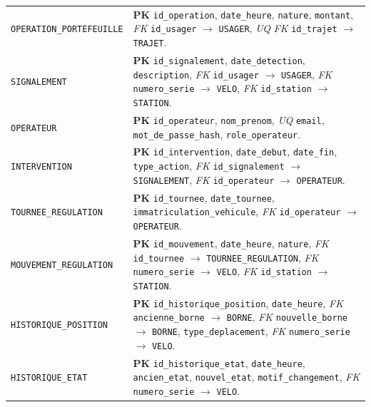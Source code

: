\documentclass[11pt,a4paper]{article}
\newcommand{\pk}{\textbf{PK}}
\newcommand{\fk}{\textit{FK}}
\newcommand{\uq}{\textit{UQ}}
\begin{document}
\begin{longtable}{>{\raggedright\arraybackslash}p{}>{\raggedright\arraybackslash}p{}}
\texttt{OPERATION\_PORTEFEUILLE} & \pk{} \texttt{id\_operation}, \texttt{date\_heure}, \texttt{nature}, \texttt{montant}, \fk{} \texttt{id\_usager} $\rightarrow$ \texttt{USAGER}, \uq{} \fk{} \texttt{id\_trajet} $\rightarrow$ \texttt{TRAJET}.\\
\texttt{SIGNALEMENT} & \pk{} \texttt{id\_signalement}, \texttt{date\_detection}, \texttt{description}, \fk{} \texttt{id\_usager} $\rightarrow$ \texttt{USAGER}, \fk{} \texttt{numero\_serie} $\rightarrow$ \texttt{VELO}, \fk{} \texttt{id\_station} $\rightarrow$ \texttt{STATION}.\\
\texttt{OPERATEUR} & \pk{} \texttt{id\_operateur}, \texttt{nom\_prenom}, \uq{} \texttt{email}, \texttt{mot\_de\_passe\_hash}, \texttt{role\_operateur}.\\
\texttt{INTERVENTION} & \pk{} \texttt{id\_intervention}, \texttt{date\_debut}, \texttt{date\_fin}, \texttt{type\_action}, \fk{} \texttt{id\_signalement} $\rightarrow$ \texttt{SIGNALEMENT}, \fk{} \texttt{id\_operateur} $\rightarrow$ \texttt{OPERATEUR}.\\
\texttt{TOURNEE\_REGULATION} & \pk{} \texttt{id\_tournee}, \texttt{date\_tournee}, \texttt{immatriculation\_vehicule}, \fk{} \texttt{id\_operateur} $\rightarrow$ \texttt{OPERATEUR}.\\
\texttt{MOUVEMENT\_REGULATION} & \pk{} \texttt{id\_mouvement}, \texttt{date\_heure}, \texttt{nature}, \fk{} \texttt{id\_tournee} $\rightarrow$ \texttt{TOURNEE\_REGULATION}, \fk{} \texttt{numero\_serie} $\rightarrow$ \texttt{VELO}, \fk{} \texttt{id\_station} $\rightarrow$ \texttt{STATION}.\\
\texttt{HISTORIQUE\_POSITION} & \pk{} \texttt{id\_historique\_position}, \texttt{date\_heure}, \fk{} \texttt{ancienne\_borne} $\rightarrow$ \texttt{BORNE}, \fk{} \texttt{nouvelle\_borne} $\rightarrow$ \texttt{BORNE}, \texttt{type\_deplacement}, \fk{} \texttt{numero\_serie} $\rightarrow$ \texttt{VELO}.\\
\texttt{HISTORIQUE\_ETAT} & \pk{} \texttt{id\_historique\_etat}, \texttt{date\_heure}, \texttt{ancien\_etat}, \texttt{nouvel\_etat}, \texttt{motif\_changement}, \fk{} \texttt{numero\_serie} $\rightarrow$ \texttt{VELO}.\\
\end{longtable}
\normalsize
\end{document}
